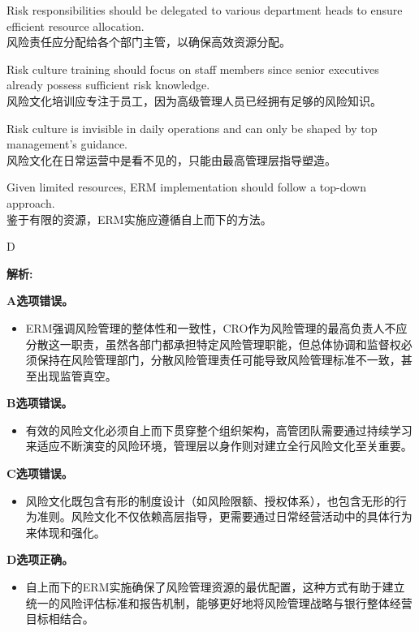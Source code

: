\documentclass{article}
\newenvironment{explanation}
{\textbf{解析:}\par}
{\par}
\begin{document}
    \begin{choices}
        \item Risk responsibilities should be delegated to various department heads to ensure efficient resource allocation. \\
        风险责任应分配给各个部门主管，以确保高效资源分配。
        \item Risk culture training should focus on staff members since senior executives already possess sufficient risk knowledge. \\
        风险文化培训应专注于员工，因为高级管理人员已经拥有足够的风险知识。
        \item Risk culture is invisible in daily operations and can only be shaped by top management's guidance. \\
        风险文化在日常运营中是看不见的，只能由最高管理层指导塑造。
        \item Given limited resources, ERM implementation should follow a top-down approach. \\
        鉴于有限的资源，ERM实施应遵循自上而下的方法。
    \end{choices}
    
    \begin{correctanswer}
    D
    \end{correctanswer}
    
    \begin{explanation}
        \textbf{A选项错误。}
        \begin{itemize}
            \item ERM强调风险管理的整体性和一致性，CRO作为风险管理的最高负责人不应分散这一职责，虽然各部门都承担特定风险管理职能，但总体协调和监督权必须保持在风险管理部门，分散风险管理责任可能导致风险管理标准不一致，甚至出现监管真空。
        \end{itemize}
        
        \textbf{B选项错误。}
        \begin{itemize}
            \item 有效的风险文化必须自上而下贯穿整个组织架构，高管团队需要通过持续学习来适应不断演变的风险环境，管理层以身作则对建立全行风险文化至关重要。
        \end{itemize}
        
        \textbf{C选项错误。}
        \begin{itemize}
            \item 风险文化既包含有形的制度设计（如风险限额、授权体系），也包含无形的行为准则。风险文化不仅依赖高层指导，更需要通过日常经营活动中的具体行为来体现和强化。
        \end{itemize}
        
        \textbf{D选项正确。}
        \begin{itemize}
            \item 自上而下的ERM实施确保了风险管理资源的最优配置，这种方式有助于建立统一的风险评估标准和报告机制，能够更好地将风险管理战略与银行整体经营目标相结合。
        \end{itemize}
    \end{explanation}
    
\end{document}
